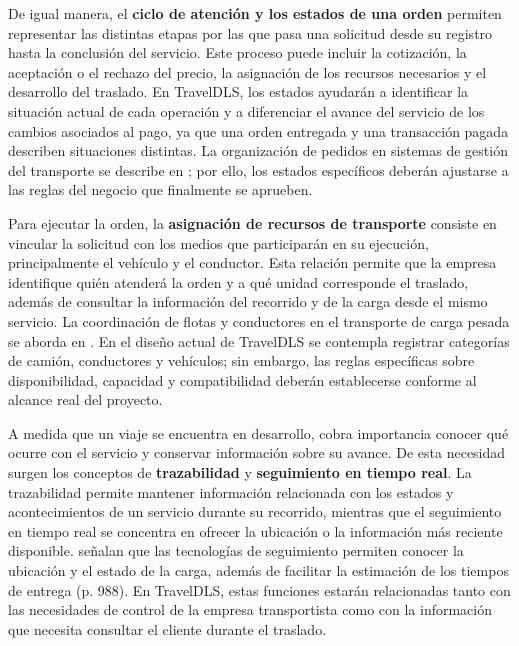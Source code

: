 De igual manera, el \hypertarget{concepto-estados}{\textbf{ciclo de atención y los estados de una orden}} permiten representar las distintas etapas por las que pasa una solicitud desde su registro hasta la conclusión del servicio. Este proceso puede incluir la cotización, la aceptación o el rechazo del precio, la asignación de los recursos necesarios y el desarrollo del traslado. En TravelDLS, los estados ayudarán a identificar la situación actual de cada operación y a diferenciar el avance del servicio de los cambios asociados al pago, ya que una orden entregada y una transacción pagada describen situaciones distintas. La organización de pedidos en sistemas de gestión del transporte se describe en \textcite{sepulveda2023propuesta}; por ello, los estados específicos deberán ajustarse a las reglas del negocio que finalmente se aprueben.

Para ejecutar la orden, la \hypertarget{concepto-asignacion}{\textbf{asignación de recursos de transporte}} consiste en vincular la solicitud con los medios que participarán en su ejecución, principalmente el vehículo y el conductor. Esta relación permite que la empresa identifique quién atenderá la orden y a qué unidad corresponde el traslado, además de consultar la información del recorrido y de la carga desde el mismo servicio. La coordinación de flotas y conductores en el transporte de carga pesada se aborda en \textcite{laura2024tecnologias}. En el diseño actual de TravelDLS se contempla registrar categorías de camión, conductores y vehículos; sin embargo, las reglas específicas sobre disponibilidad, capacidad y compatibilidad deberán establecerse conforme al alcance real del proyecto.

A medida que un viaje se encuentra en desarrollo, cobra importancia conocer qué ocurre con el servicio y conservar información sobre su avance. De esta necesidad surgen los conceptos de \hypertarget{concepto-trazabilidad}{\textbf{trazabilidad}} y \hypertarget{concepto-seguimiento-tiempo-real}{\textbf{seguimiento en tiempo real}}. La trazabilidad permite mantener información relacionada con los estados y acontecimientos de un servicio durante su recorrido, mientras que el seguimiento en tiempo real se concentra en ofrecer la ubicación o la información más reciente disponible. \textcite{pauzuoliene2024smart} señalan que las tecnologías de seguimiento permiten conocer la ubicación y el estado de la carga, además de facilitar la estimación de los tiempos de entrega (p. 988). En TravelDLS, estas funciones estarán relacionadas tanto con las necesidades de control de la empresa transportista como con la información que necesita consultar el cliente durante el traslado.


